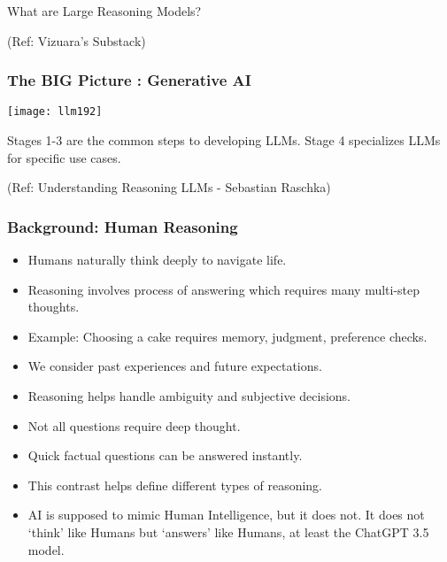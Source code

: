 \begin{frame}[fragile]\frametitle{}
\begin{center}
{\Large What are Large Reasoning Models?}

{\tiny (Ref: Vizuara's Substack)}

\end{center}


\end{frame}

\begin{frame}[fragile]\frametitle{The BIG Picture : Generative AI}
		\begin{center}
		\texttt{[image: llm192]}
		
		
		Stages 1-3 are the common steps to developing LLMs. Stage 4 specializes LLMs for specific use 
		cases.
		
		
		{\tiny (Ref: Understanding Reasoning LLMs - Sebastian Raschka)}
		
		\end{center}
		
\end{frame}
		
\begin{frame}[fragile]\frametitle{Background: Human Reasoning}
\begin{itemize}
  \item Humans naturally think deeply to navigate life.
  \item Reasoning involves process of answering which requires many multi-step thoughts.
  \item Example: Choosing a cake requires memory, judgment, preference checks.
  \item We consider past experiences and future expectations.
  \item Reasoning helps handle ambiguity and subjective decisions.
  \item Not all questions require deep thought.
  \item Quick factual questions can be answered instantly.
  \item This contrast helps define different types of reasoning.
  \item AI is supposed to mimic Human Intelligence, but it does not. It does not `think' like Humans but `answers' like Humans, at least the ChatGPT 3.5 model.
\end{itemize}

\end{frame}

